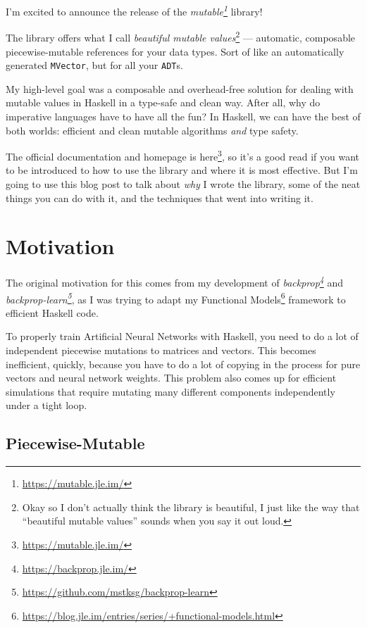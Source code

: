 \documentclass[]{article}
\renewcommand{\href}[2]{#2\footnote{\url{#1}}}
\begin{document}
I'm excited to announce the release of the
\emph{\href{https://mutable.jle.im/}{mutable}} library!

The library offers what I call \emph{beautiful mutable values}\footnote{Okay so
  I don't actually think the library is beautiful, I just like the way that
  ``beautiful mutable values'' sounds when you say it out loud.} --- automatic,
composable piecewise-mutable references for your data types. Sort of like an
automatically generated \texttt{MVector}, but for all your \texttt{ADT}s.

My high-level goal was a composable and overhead-free solution for dealing with
mutable values in Haskell in a type-safe and clean way. After all, why do
imperative languages have to have all the fun? In Haskell, we can have the best
of both worlds: efficient and clean mutable algorithms \emph{and} type safety.

The \href{https://mutable.jle.im/}{official documentation and homepage is here},
so it's a good read if you want to be introduced to how to use the library and
where it is most effective. But I'm going to use this blog post to talk about
\emph{why} I wrote the library, some of the neat things you can do with it, and
the techniques that went into writing it.

\section{Motivation}\label{motivation}

The original motivation for this comes from my development of
\emph{\href{https://backprop.jle.im/}{backprop}} and
\emph{\href{https://github.com/mstksg/backprop-learn}{backprop-learn}}, as I was
trying to adapt my
\href{https://blog.jle.im/entries/series/+functional-models.html}{Functional
Models} framework to efficient Haskell code.

To properly train Artificial Neural Networks with Haskell, you need to do a lot
of independent piecewise mutations to matrices and vectors. This becomes
inefficient, quickly, because you have to do a lot of copying in the process for
pure vectors and neural network weights. This problem also comes up for
efficient simulations that require mutating many different components
independently under a tight loop.

\subsection{Piecewise-Mutable}\label{piecewise-mutable}
\end{document}
